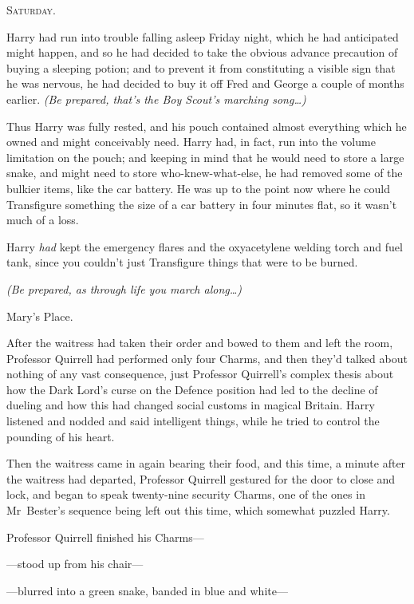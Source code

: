 
\lettrine{S}{aturday}.

\quad\quad
Harry had run into trouble falling asleep Friday night, which he had
anticipated might happen, and so he had decided to take the obvious advance
precaution of buying a sleeping potion; and to prevent it from constituting a
visible sign that he was nervous, he had decided to buy it off Fred and George
a couple of months earlier. \emph{(Be prepared, that’s the Boy Scout’s marching
song…)}

Thus Harry was fully rested, and his pouch contained almost everything which he
owned and might conceivably need. Harry had, in fact, run into the volume
limitation on the pouch; and keeping in mind that he would need to store a
large snake, and might need to store who-knew-what-else, he had removed some of
the bulkier items, like the car battery. He was up to the point now where he
could Transfigure something the size of a car battery in four minutes flat, so
it wasn’t much of a loss.

Harry \emph{had} kept the emergency flares and the oxyacetylene welding torch
and fuel tank, since you couldn’t just Transfigure things that were to be
burned.

\emph{(Be prepared, as through life you march along…)}

Mary’s Place.

After the waitress had taken their order and bowed to them and left the room,
Professor Quirrell had performed only four Charms, and then they’d talked about
nothing of any vast consequence, just Professor Quirrell’s complex thesis about
how the Dark Lord’s curse on the Defence position had led to the decline of
dueling and how this had changed social customs in magical Britain. Harry
listened and nodded and said intelligent things, while he tried to control the
pounding of his heart.

Then the waitress came in again bearing their food, and this time, a minute
after the waitress had departed, Professor Quirrell gestured for the door to
close and lock, and began to speak twenty-nine security Charms, one of the ones
in Mr~Bester’s sequence being left out this time, which somewhat puzzled Harry.

Professor Quirrell finished his Charms—

—stood up from his chair—

—blurred into a green snake, banded in blue and white—

